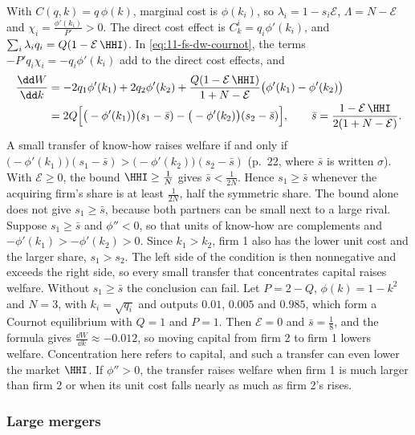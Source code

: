 With $C(q, k) = q\,\phi(k)$, marginal cost is $\phi(k_i)$, so $\lambda_i = 1 - s_i\mathcal{E}$, $\Lambda = N -
\mathcal{E}$ and $\chi_i = \frac{\phi'(k_i)}{P'} > 0$. The direct cost effect is $C^i_k = q_i\phi'(k_i)$, and
$\sum_i\lambda_iq_i = Q(1 - \mathcal{E}\,\HHI)$. In \eqref{eq:11-fs-dw-cournot}, the terms $-P'q_i\chi_i =
-q_i\phi'(k_i)$ add to the direct cost effects, and
\begin{align*}
\frac{\dd W}{\dd k}
&= -2q_1\phi'(k_1) + 2q_2\phi'(k_2) + \frac{Q(1 - \mathcal{E}\,\HHI)}{1 + N - \mathcal{E}}\big(\phi'(k_1) -
\phi'(k_2)\big) \\
&= 2Q\Big[\big(-\phi'(k_1)\big)(s_1 - \bar s) - \big(-\phi'(k_2)\big)(s_2 - \bar s)\Big],
\qquad
\bar s = \frac{1 - \mathcal{E}\,\HHI}{2(1 + N - \mathcal{E})} .
\end{align*}
A small transfer of know-how raises welfare if and only if $\big(-\phi'(k_1)\big)(s_1 - \bar s) >
\big(-\phi'(k_2)\big)(s_2 - \bar s)$ (p.~22, where $\bar s$ is written $\sigma$). With $\mathcal{E} \ge 0$, the
bound $\HHI \ge \frac{1}{N}$ gives $\bar s < \frac{1}{2N}$. Hence $s_1 \ge \bar s$ whenever the acquiring firm's
share is at least $\frac{1}{2N}$, half the symmetric share. The bound alone does not give $s_1 \ge \bar s$, because
both partners can be small next to a large rival. Suppose $s_1 \ge \bar s$ and $\phi'' < 0$, so that units of know-how are
complements and $-\phi'(k_1) > -\phi'(k_2) > 0$. Since $k_1 > k_2$, firm 1 also has the lower unit cost and the
larger share, $s_1 > s_2$. The left side of the condition is then nonnegative and exceeds the right side, so every
small transfer that concentrates capital raises welfare. Without $s_1 \ge \bar s$ the conclusion can fail. Let $P = 2 -
Q$, $\phi(k) = 1 - k^2$ and $N = 3$, with $k_i = \sqrt{q_i}$ and outputs $0.01$, $0.005$ and $0.985$, which form a
Cournot equilibrium with $Q = 1$ and $P = 1$. Then $\mathcal{E} = 0$ and $\bar s = \frac{1}{8}$, and the formula
gives $\frac{\dd W}{\dd k} \approx -0.012$, so moving capital from firm 2 to firm 1 lowers welfare. Concentration here
refers to capital, and such a transfer can even lower the market $\HHI$. If $\phi'' > 0$, the transfer raises welfare when firm 1 is much larger than firm 2 or when
its unit cost falls nearly as much as firm 2's rises.

\subsubsection{Large mergers}

